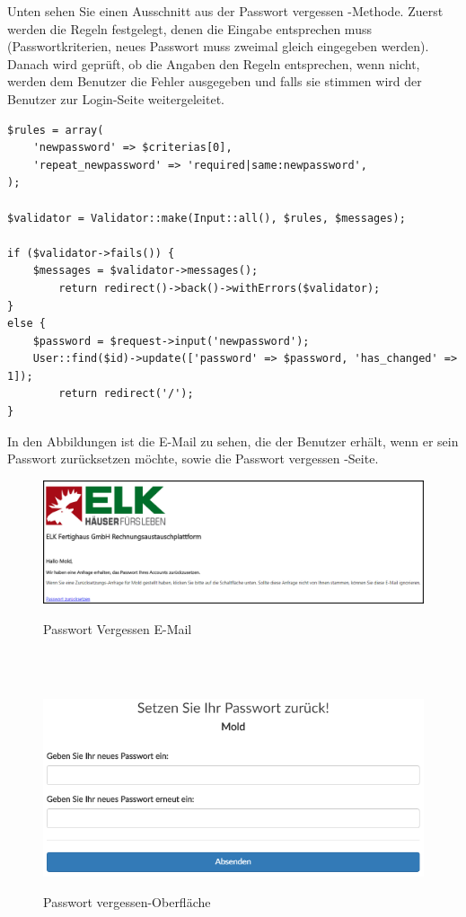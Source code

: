 Unten sehen Sie einen Ausschnitt aus der \glqq Passwort vergessen\grqq{} -Methode. Zuerst werden die Regeln festgelegt, denen die Eingabe entsprechen muss (Passwortkriterien, neues Passwort muss zweimal gleich eingegeben werden). Danach wird geprüft, ob die Angaben den Regeln entsprechen, wenn nicht, werden dem Benutzer die Fehler ausgegeben und falls sie stimmen wird der Benutzer zur Login-Seite weitergeleitet.

\begin{lstlisting}
$rules = array(
	'newpassword' => $criterias[0],
	'repeat_newpassword' => 'required|same:newpassword',
);

$validator = Validator::make(Input::all(), $rules, $messages);

if ($validator->fails()) {
	$messages = $validator->messages();
		return redirect()->back()->withErrors($validator);
} 
else {
	$password = $request->input('newpassword');
	User::find($id)->update(['password' => $password, 'has_changed' => 1]);
		return redirect('/');
}
\end{lstlisting}
\newpage
In den Abbildungen ist die E-Mail zu sehen, die der Benutzer erhält, wenn er sein Passwort zurücksetzen möchte, sowie die \glqq Passwort vergessen\grqq{} -Seite. 
\begin{figure}[!h]
    \centering
    \includegraphics[width=17cm]{figures/mail.png}
    \label{fig:takebill}
    \caption{Passwort Vergessen E-Mail}
\end{figure}
\\ \\
\begin{figure}[!h]
    \centering
    \includegraphics[width=17cm]{figures/vergessenmock.png}
    \label{fig:takebill}
    \caption{Passwort vergessen-Oberfläche}
\end{figure}

